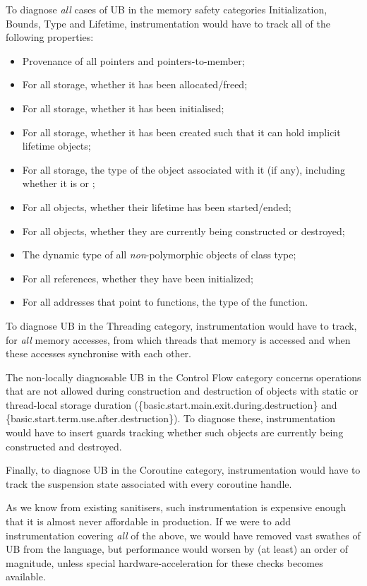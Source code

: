 To diagnose \emph{all} cases of UB in the memory safety categories Initialization, Bounds, Type and Lifetime, instrumentation would have to track all of the following properties:

\begin{itemize}
\item Provenance of all pointers and pointers-to-member;
\item For all storage, whether it has been allocated/freed;
\item For all storage, whether it has been initialised;
\item For all storage, whether it has been created such that it can hold implicit lifetime objects;
\item For all storage, the type of the object associated with it (if any), including whether it is  or ;
\item For all objects, whether their lifetime has been started/ended;
\item For all objects, whether they are currently being constructed or destroyed;
\item The dynamic type of all \emph{non}-polymorphic objects of class type;
\item For all references, whether they have been initialized;
\item For all addresses that point to  functions, the type of the function.
\end{itemize}

To diagnose UB in the Threading category, instrumentation would have to track, for \emph{all} memory accesses, from which threads that memory is accessed and when these accesses synchronise with each other.

The non-locally diagnosable UB in the Control Flow category concerns operations that are not allowed during construction and destruction of objects with static or thread-local storage duration (\{basic.start.main.exit.during.destruction\} and \{basic.start.term.use.after.destruction\}). To diagnose these, instrumentation would have to insert guards tracking whether such objects are currently being constructed and destroyed.  

Finally, to diagnose UB in the Coroutine category, instrumentation would have to track the suspension state associated with every coroutine handle.

As we know from existing sanitisers, such instrumentation is expensive enough that it is almost never affordable in production. If we were to add instrumentation covering \emph{all} of the above, we would have removed vast swathes of UB from the language, but performance would worsen by (at least) an order of magnitude, unless special hardware-acceleration for these checks becomes available.

